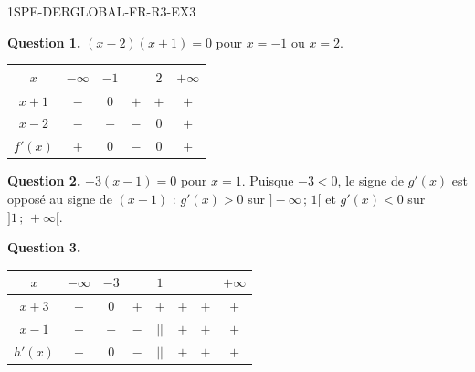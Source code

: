 \begin{corrige}{1SPE-DERGLOBAL-FR-R3-EX3}

\textbf{Question 1.} $(x-2)(x+1) = 0$ pour $x = -1$ ou $x = 2$.

\medskip
\begin{center}
\begin{tabular}{|c|ccccc|}
\hline
$x$ & $-\infty$ & $-1$ & & $2$ & $+\infty$ \\
\hline
$x+1$ & $-$ & $0$ & $+$ & $+$ & $+$ \\
$x-2$ & $-$ & $-$ & $-$ & $0$ & $+$ \\
$f'(x)$ & $+$ & $0$ & $-$ & $0$ & $+$ \\
\hline
\end{tabular}
\end{center}

\medskip

\textbf{Question 2.} $-3(x-1) = 0$ pour $x = 1$. Puisque $-3 < 0$, le signe de $g'(x)$ est opposé au signe de $(x-1)$ : $g'(x) > 0$ sur $]-\infty\,;\,1[$ et $g'(x) < 0$ sur $]1\,;\,+\infty[$.

\textbf{Question 3.}


\begin{center}
\begin{tabular}{|c|ccccccc|}
\hline
$x$ & $-\infty$ & $-3$ & & $1$ & & & $+\infty$ \\
\hline
$x+3$ & $-$ & $0$ & $+$ & $+$ & $+$ & $+$ & $+$ \\
$x-1$ & $-$ & $-$ & $-$ & $||$ & $+$ & $+$ & $+$ \\
$h'(x)$ & $+$ & $0$ & $-$ & $||$ & $+$ & $+$ & $+$ \\
\hline
\end{tabular}
\end{center}

\end{corrige}

